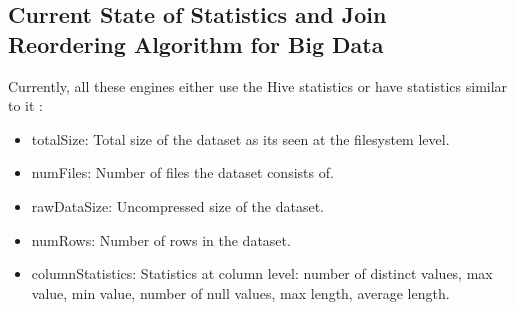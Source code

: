\subsection{Current State of Statistics and Join Reordering Algorithm for Big Data}

Currently, all these engines either use the Hive statistics or have statistics similar to it \cite{b1}:
\begin{itemize}
\item totalSize: Total size of the dataset as its seen at the filesystem level.
\item numFiles: Number of files the dataset consists of.
\item rawDataSize: Uncompressed size of the dataset.
\item numRows: Number of rows in the dataset.
\item columnStatistics: Statistics at column level: number of distinct values, max value, min value, number of null values, max length, average length.
\end{itemize}
